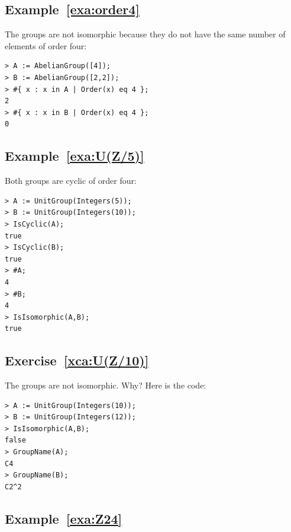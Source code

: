 
\subsection*{Example~\ref{exa:order4}}

The groups are not isomorphic because 
they do not have the same number of elements of order four: 
\begin{lstlisting}
> A := AbelianGroup([4]);
> B := AbelianGroup([2,2]);
> #{ x : x in A | Order(x) eq 4 };
2
> #{ x : x in B | Order(x) eq 4 };
0
\end{lstlisting}

\subsection*{Example~\ref{exa:U(Z/5)}}

Both groups are cyclic of order four: 
\begin{lstlisting}
> A := UnitGroup(Integers(5));
> B := UnitGroup(Integers(10));
> IsCyclic(A);
true
> IsCyclic(B);
true
> #A;
4
> #B;
4    
> IsIsomorphic(A,B);
true
\end{lstlisting}

\subsection*{Exercise~\ref{xca:U(Z/10)}}

The groups are not isomorphic. Why? 
Here is the code: 
\begin{lstlisting}
> A := UnitGroup(Integers(10));
> B := UnitGroup(Integers(12));
> IsIsomorphic(A,B);
false    
> GroupName(A);
C4
> GroupName(B);
C2^2
\end{lstlisting}

\subsection*{Example~\ref{exa:Z24}}

